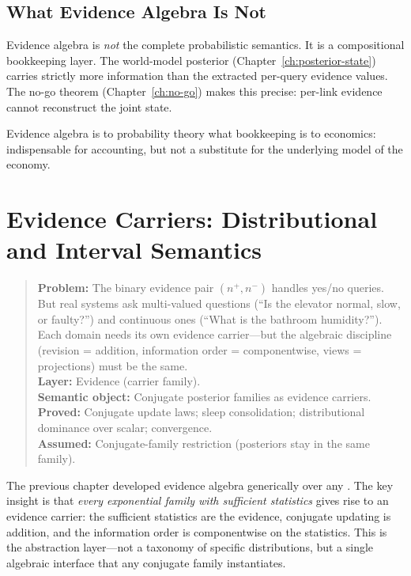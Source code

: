 \documentclass[11pt,openany]{report}
\begin{document}
\section{What Evidence Algebra Is Not}

Evidence algebra is \emph{not} the complete probabilistic semantics.
It is a compositional bookkeeping layer.  The world-model posterior
(Chapter~\ref{ch:posterior-state}) carries strictly more information
than the extracted per-query evidence values.  The no-go theorem
(Chapter~\ref{ch:no-go}) makes this precise: per-link evidence cannot
reconstruct the joint state.

Evidence algebra is to probability theory what bookkeeping is to
economics: indispensable for accounting, but not a substitute for the
underlying model of the economy.


\chapter{Evidence Carriers: Distributional and Interval Semantics}
\label{ch:distributional}

\begin{quote}\small
\textbf{Problem:} The binary evidence pair $(n^+, n^-)$ handles
yes/no queries.  But real systems ask multi-valued questions
(``Is the elevator normal, slow, or faulty?'') and continuous ones
(``What is the bathroom humidity?'').  Each domain needs its own
evidence carrier---but the algebraic discipline (revision = addition,
information order = componentwise, views = projections) must be
the same.\\[4pt]
\textbf{Layer:} Evidence (carrier family).\\
\textbf{Semantic object:} Conjugate posterior families as evidence carriers.\\
\textbf{Proved:} Conjugate update laws; sleep consolidation; distributional dominance over scalar; convergence.\\
\textbf{Assumed:} Conjugate-family restriction (posteriors stay in the same family).
\end{quote}

The previous chapter developed evidence algebra generically over any
.  The key insight is that \emph{every
exponential family with sufficient statistics} gives rise to an evidence
carrier: the sufficient statistics are the evidence, conjugate updating
is addition, and the information order is componentwise on the
statistics.  This is the abstraction layer---not a taxonomy of specific
distributions, but a single algebraic interface that any conjugate family
instantiates.
\end{document}
